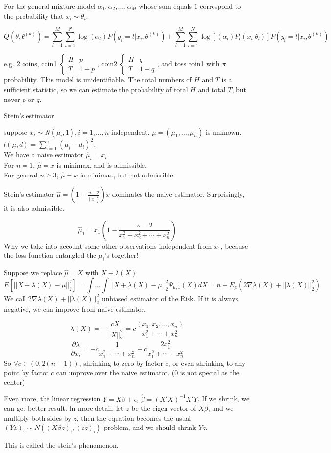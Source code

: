 \documentclass[11pt]{article}
\begin{document}
For the general mixture model
$
\alpha_1, \alpha_2, \dots, \alpha_M
$
whose sum equals $1$ correspond to the probability that
$x_i \sim \theta_i$.

$$
Q(\theta, \theta^{(k)}) =
\sum_{l=1}^{M}
\sum_{i=1}^{N}
\log(\alpha_l)P(y_i=l | x_i, \theta^{(k)})
+
\sum_{l=1}^{M}
\sum_{i=1}^{N}
\log[(\alpha_l)P_l( x_i | \theta_l)] P(y_i=l | x_i, \theta^{(k)})
$$

e.g. 2 coins,
coin1
$
\left\{
\begin{array}{ll}
H & p
\\
T & 1-p
\end{array}
\right.
$,
coin2
$
\left\{
\begin{array}{ll}
H & q
\\
T & 1-q
\end{array}
\right.
$,
and toss coin1 with $\pi$ probability.
This model is unidentifiable. The total numbers of $H$ and $T$ is a sufficient statistic, so we can estimate the probability of total $H$ and total $T$, but never $p$ or $q$.

Stein's estimator

suppose $x_i \sim N(\mu_i, 1), i=1,\dots, n$ independent.
$\mu=(\mu_1, \dots, \mu_n)$ is unknown.
$l(\mu, d) = \sum_{i=1}^{n} (\mu_i-d_i)^2$.
\\
We have a naive estimator $\hat{\mu}_i = x_i$.
\\
For $n=1$, $\hat{\mu} = x$ is minimax, and is admissible.
\\
For general $n\geq 3$, $\hat{\mu}=x$ is minimax, but not admissible.

Stein's estimator
$
\hat{\mu} =
(1-\frac{n-2}{||x||_2^2})x
$
dominates the naive estimator. Surprisingly, it is also admissible.

$$
\hat{\mu}_1 =
x_1\left(1-\frac{n-2}{x_1^2+x_2^2+\cdots+x_n^2}\right)
$$
Why we take into account some other observations independent from $x_1$, because the loss function entangled the $\mu_i$'s together!

Suppose we replace $\hat{\mu} = X$ with $X+\lambda(X)$
$$
E\left[||X+\lambda(X)-\mu||_2^2\right]
=
\int \dots \int ||X+\lambda(X)-\mu||_2^2 \Psi_{\mu,1}(X)dX
=
n + E_{\mu} (2 \nabla \lambda(X) + ||\lambda(X)||_2^2)
$$
We call
$
2 \nabla \lambda(X) + ||\lambda(X)||_2^2
$
unbiased estimator of the Risk. If it is always negative, we can improve from naive estimator.

$$
\lambda(X) = -\frac{cX}{||X||_2^2}
=
c \frac{(x_1, x_2, \dots, x_n)}{x_1^2 + \cdots + x_n^2}
$$
$$
\frac{\partial\lambda}{\partial x_i}
=
-c \frac{1}{x_1^2+\cdots+x_n^2}+c\frac{2 x_1^2}{x_1^2+\cdots+x_n^2}
$$
So $\forall c \in (0, 2(n-1))$, shrinking to zero by factor $c$, or even shrinking to any point by factor $c$ can improve over the naive estimator. ($0$ is not special as the center)

Even more, the linear regression $Y=X\beta+\epsilon$,
$\hat{\beta} = (X'X)^{-1}X'Y$.
If we shrink, we can get better result. In more detail, let $z$ be the eigen vector of $X\beta$, and we multiply both sides by $z$, then the equation becomes the usual $(Yz)_i \sim N((X\beta z)_i, (\epsilon z)_i)$ problem, and we should shrink $Yz$.

This is called the stein's phenomenon.
\end{document}
